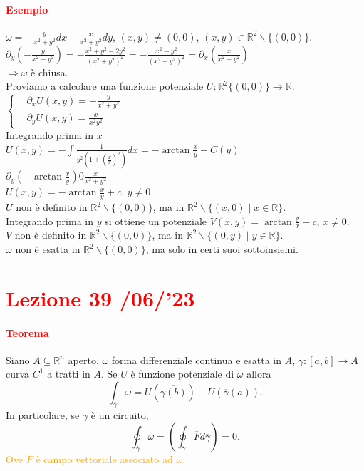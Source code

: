 \documentclass{article}
\newcommand{\R}{\mathbb{R}}
\begin{document}
\paragraph{\textcolor{red}{Esempio}}
$\omega = - \frac{y}{x^2+y^2}dx+\frac{x}{x^2+y^2}dy$, $(x,y)\neq(0,0)$, $(x,y)\in \R^2\backslash\{(0,0)\}$.\\
$\partial_y\left( -\frac{y}{x^2+y^2} \right)=-\frac{x^2+y^2-2y^2}{(x^2+y^2)^2}=-\frac{x^2-y^2}{(x^2+y^2)^2}=\partial_x\left( \frac{x}{x^2+y^2} \right)$\\
$\Rightarrow \omega$ è chiusa.\\
Proviamo a calcolare una funzione potenziale $U:\R^2\{(0,0)\}\rightarrow\R$.\\
$\begin{cases}
    &\partial_xU(x,y)=-\frac{y}{x^2+y^2}\\
    &\partial_yU(x,y)=\frac{x}{x^2y^2}
\end{cases}$\\
Integrando prima in $x$\\
$U(x,y)=-\int\frac{1}{y^2\left(1+ \left(\frac{x}{y}\right)^2 \right)}dx=-\arctan \frac{x}{y} + C(y)$\\
$\partial_y(-\arctan \frac{x}{y})0\frac{x}{x^2+y^2}$\\
$U(x,y)=-\arctan \frac{x}{y}+c$, $y \neq 0$\\
$U$ non è definito in $\R^2 \backslash\{(0,0)\}$, ma in $\R^2\backslash \{(x,0)\mid x \in\R\}$.\\
Integrando prima in $y$ si ottiene un potenziale $V(x,y)=\arctan \frac{y}{x}-c$, $x\neq 0$.\\
$V$ non è definito in $\R^2\backslash\{(0,0)\}$, ma in $\R^2\backslash\{(0,y)\mid y \in \R\}$.\\
$\omega$ non è esatta in $\R^2\backslash\{(0,0)\}$, ma solo in certi suoi sottoinsiemi.

\newpage
\section{\textcolor{red}{Lezione 39 \space{}/06/'23}}

\paragraph{\textcolor{red}{Teorema}}
Siano $A \subseteq \R^n$ aperto, $\omega$ forma differenziale continua e esatta in $A$, $\overline{\gamma}:[a,b]\rightarrow A$ curva $C^1$ a tratti in $A$. Se $U$ è funzione potenziale di $\omega$ allora
\begin{equation*}
    \int_{\overline{\gamma}}\omega =U(\overline{\gamma (b)})-U(\overline{\gamma}(a)).
\end{equation*}
In particolare, se $\overline{\gamma}$ è un circuito,
\begin{equation*}
    \oint_{\overline{\gamma}}\omega = \left( \oint_{\overline{\gamma}}\overline{F} d\overline{\gamma} \right)=0.
\end{equation*}
\textcolor{orange}{Ove $\overline{F}$ è campo vettoriale associato ad $\omega$.}
\end{document}
